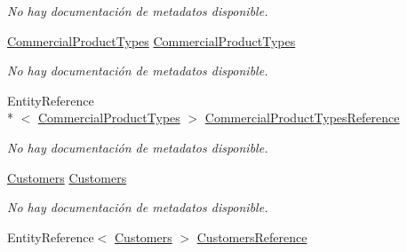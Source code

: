 \begin{DoxyCompactItemize}
\begin{DoxyCompactList}\small\item\em No hay documentación de metadatos disponible. \end{DoxyCompactList}\item 
\hyperlink{class_microsoft_1_1_samples_1_1_kinect_1_1_basic_interactions_1_1_commercial_product_types}{Commercial\-Product\-Types} \hyperlink{class_microsoft_1_1_samples_1_1_kinect_1_1_basic_interactions_1_1_commercial_products_a72f9d85030f4e231ed6220db9cf464d8}{Commercial\-Product\-Types}
\begin{DoxyCompactList}\small\item\em No hay documentación de metadatos disponible. \end{DoxyCompactList}\item 
Entity\-Reference\\*
$<$ \hyperlink{class_microsoft_1_1_samples_1_1_kinect_1_1_basic_interactions_1_1_commercial_product_types}{Commercial\-Product\-Types} $>$ \hyperlink{class_microsoft_1_1_samples_1_1_kinect_1_1_basic_interactions_1_1_commercial_products_ab3a7e3f15e0a943669ac548570dfad98}{Commercial\-Product\-Types\-Reference}
\begin{DoxyCompactList}\small\item\em No hay documentación de metadatos disponible. \end{DoxyCompactList}\item 
\hyperlink{class_microsoft_1_1_samples_1_1_kinect_1_1_basic_interactions_1_1_customers}{Customers} \hyperlink{class_microsoft_1_1_samples_1_1_kinect_1_1_basic_interactions_1_1_commercial_products_ae2adea75ecf4009467930eea108c15a1}{Customers}
\begin{DoxyCompactList}\small\item\em No hay documentación de metadatos disponible. \end{DoxyCompactList}\item 
Entity\-Reference$<$ \hyperlink{class_microsoft_1_1_samples_1_1_kinect_1_1_basic_interactions_1_1_customers}{Customers} $>$ \hyperlink{class_microsoft_1_1_samples_1_1_kinect_1_1_basic_interactions_1_1_commercial_products_a63f7ed25f372bdd877c330525f579236}{Customers\-Reference}

\end{DoxyCompactItemize}
